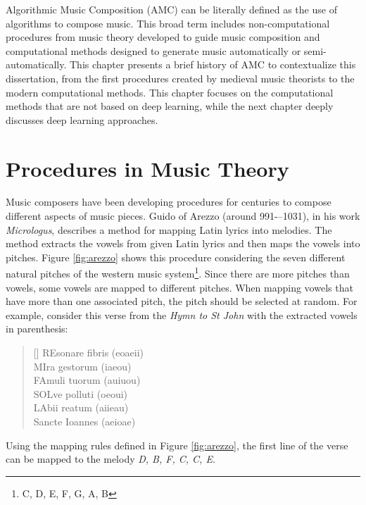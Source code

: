 
Algorithmic Music Composition (AMC) can be literally defined as the use of algorithms to compose music.
This broad term includes non-computational procedures from music theory developed to guide music
composition and computational methods designed to generate music automatically or semi-automatically. This
chapter presents a brief history of AMC to contextualize this dissertation, from the first procedures
created by medieval music theorists to the modern computational methods. This chapter focuses on the
computational methods that are not based on deep learning, while the next chapter deeply
discusses deep learning approaches.

\section{Procedures in Music Theory}

Music composers have been developing procedures for centuries to compose different aspects of music pieces. Guido of Arezzo (around 991-–1031), in his work \textit{Micrologus}, describes a method for mapping Latin lyrics into melodies. The method extracts the vowels from given Latin lyrics and then maps the vowels into pitches. Figure \ref{fig:arezzo} shows this procedure considering the seven different natural pitches of the western music system\footnote{C, D, E, F, G, A, B}. Since there are more pitches than vowels, some vowels are mapped to different pitches. When mapping vowels that have more than one associated pitch, the pitch should be selected at random. For example, consider this verse from the \textit{Hymn to St John} with the extracted vowels in parenthesis:

\settowidth{\versewidth}{UT queant laxis,}
\begin{verse}[\versewidth]
    REsonare fibris (eoaeii) \\
    MIra gestorum (iaeou) \\
    FAmuli tuorum (auiuou) \\
    SOLve polluti (oeoui)\\
    LAbii reatum  (aiieau)\\
    Sancte Ioannes (aeioae)
\end{verse}

Using the mapping rules defined in Figure \ref{fig:arezzo}, the first line of the verse can
be mapped to the melody \textit{D, B, F, C, C, E}.

